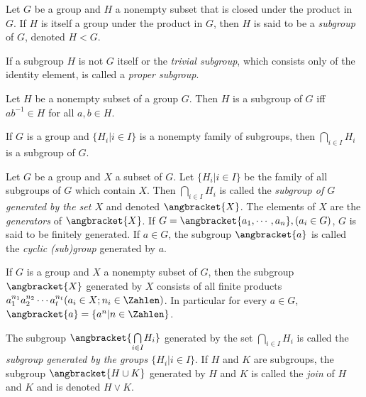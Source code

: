 \begin{Definition}
	Let $ G $ be a group and $ H $ a nonempty subset that is closed under the product in $ G $. If $ H $ is itself a group under the product in $ G $, then $ H $ is said to be a \textit{subgroup} of $ G $, denoted $ H<G $.
\end{Definition}
\begin{Definition}
	If a subgroup $ H $ is not $ G $ itself or the \textit{trivial subgroup}, which consists only of the identity element, is called a \textit{proper subgroup}.
\end{Definition}
\begin{Theorem}
	Let $ H $ be a nonempty subset of a group $ G $. Then $ H $ is a subgroup of $ G $ iff $ a b^{-1}\in H $ for all $ a,b \in H $.
\end{Theorem}
\begin{Corollary}
	If $ G $ is a group and $ \{H_i|i \in I \} $ is a nonempty family of subgroups, then $ \underset{i \in I}{\bigcap}H_i $ is a subgroup of $ G $.
\end{Corollary}


\begin{Definition}
	Let $ G $ be a group and $ X $ a subset of $ G $. Let $ \{H_i|i \in I \} $ be the family of all subgroups of $ G $ which contain $ X $. Then $ \underset{i \in I}{\bigcap}H_i $ is called the \textit{subgroup of $ G $ generated by the set $ X $} and denoted $ \angbracket{X}$. The elements of $ X $ are the \textit{generators} of $ \angbracket{X} $. If $ G=\angbracket{a_1,\cdots,a_n} ,(a_i \in G)$, $ G $ is said to be finitely generated. If $ a \in G $, the subgroup $ \angbracket{a} $ is called the \textit{cyclic (sub)group} generated by $ a $.
\end{Definition}

\begin{Theorem}
	If $ G $ is a group and $ X $ a nonempty subset of $ G $, then the subgroup $ \angbracket{X} $ generated by $ X $ consists of all finite products $ a_1^{n_1} a_2^{n_2}\cdots a_t^{n_t}(a_i \in X;n_i \in \Zahlen)$. In particular for every $ a \in G $, $ \angbracket{a}=\{a^n|n\in \Zahlen \} $.
\end{Theorem}

\begin{Definition}
	The subgroup $ \angbracket{\underset{i \in I}{\bigcap}H_i } $ generated by the set $ \underset{i \in I}{\bigcap}H_i  $ is called the \textit{subgroup generated by the groups $ \{H_i | i \in I \} $}. If $ H $ and $ K $ are subgroups, the subgroup $ \angbracket{H \cup K} $ generated by $ H $ and $ K $ is called the \textit{join} of $ H $ and $ K $ and is denoted $ H \lor K $.
\end{Definition}



